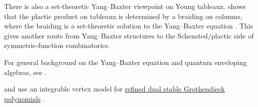 There is also a set-theoretic Yang--Baxter viewpoint on Young tableaux.
 shows that the plactic product on tableaux is
determined by a braiding on columns, where the braiding is a
set-theoretic solution to the Yang--Baxter equation
\cite{Lebed2020Plactic}.  This gives another route from Yang--Baxter
structures to the Schensted/plactic side of symmetric-function combinatorics.

For general background on the Yang--Baxter equation and quantum enveloping
algebras, see \cite{Ma1993YangBaxter}.

 and  use an integrable vertex
model for \hyperref[grothendieckRefinedDualStable]{refined dual stable
Grothendieck polynomials} \cite{MotegiScrimshaw2025}.
